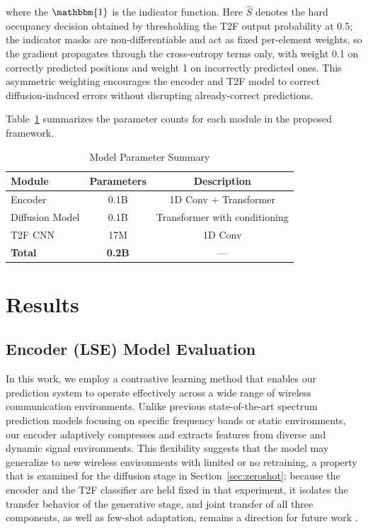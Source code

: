 \documentclass[lettersize,journal]{IEEEtran}
\begin{document}
where the $\mathbbm{1}$ is the indicator function. Here $\hat{S}$ denotes the hard occupancy decision obtained by thresholding the T2F output probability at 0.5; the indicator masks are non-differentiable and act as fixed per-element weights, so the gradient propagates through the cross-entropy terms only, with weight 0.1 on correctly predicted positions and weight 1 on incorrectly predicted ones. This asymmetric weighting encourages the encoder and T2F model to correct diffusion-induced errors without disrupting already-correct predictions.

Table~\ref{tab:model_params} summarizes the parameter counts 
for each module in the proposed framework.

\begin{table}[h]
\centering
\caption{Model Parameter Summary}
\label{tab:model_params}
\begin{tabular}{lcc}
\hline
\textbf{Module} & \textbf{Parameters} & \textbf{Description} \\
\hline
Encoder        & 0.1B & 1D Conv + Transformer \\
Diffusion Model & 0.1B & Transformer with conditioning\\
T2F CNN        & 17M & 1D Conv \\
\hline
\textbf{Total} & \textbf{0.2B} & — \\
\hline
\end{tabular}
\end{table}

\section{Results}
\subsection{Encoder (LSE) Model Evaluation}
In this work, we employ a contrastive learning method that enables our prediction system to operate effectively across a wide range of wireless communication environments. Unlike previous state-of-the-art spectrum prediction models focusing on specific frequency bands or static environments, our encoder adaptively compresses and extracts features from diverse and dynamic signal environments. This flexibility suggests that the model may generalize to new wireless environments with limited or no retraining, a property that is examined for the diffusion stage in Section~\ref{sec:zeroshot}; because the encoder and the T2F classifier are held fixed in that experiment, it isolates the transfer behavior of the generative stage, and joint transfer of all three components, as well as few-shot adaptation, remains a direction for future work \cite{result_ref1, result_ref2, result_ref3}.
\end{document}
